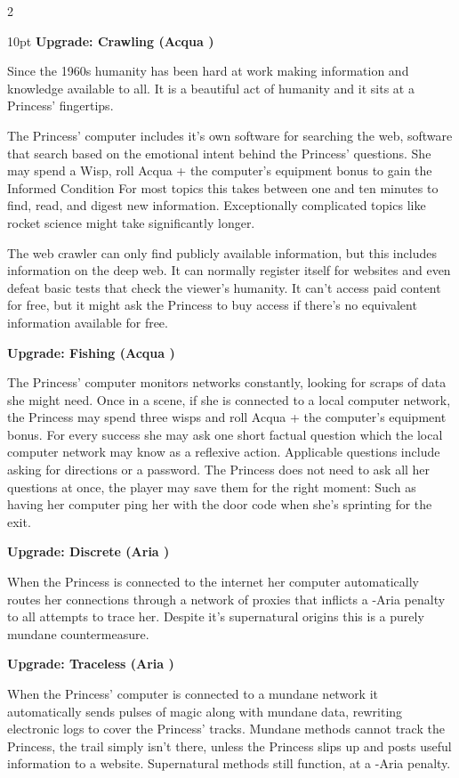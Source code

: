 \begin{multicols}{2}
\begin{myindentpar}{10pt}
\textbf{Upgrade: Crawling (Acqua \textbullet\textbullet)}

Since the 1960s humanity has been hard at work making information and knowledge available to all. It is a beautiful act of humanity and it sits at a Princess' fingertips. 

The Princess' computer includes it's own software for searching the web, software that search based on the emotional intent behind the Princess' questions. She may spend a Wisp, roll Acqua + the computer's equipment bonus to gain the Informed Condition For most topics this takes between one and ten minutes to find, read, and digest new information. Exceptionally complicated topics like rocket science might take significantly longer.

The web crawler can only find publicly available information, but this includes information on the deep web. It can normally register itself for websites and even defeat basic tests that check the viewer's humanity. It can't access paid content for free, but it might ask the Princess to buy access if there's no equivalent information available for free. 

\textbf{Upgrade: Fishing (Acqua \textbullet\textbullet)}

The Princess' computer monitors networks constantly, looking for scraps of data she might need. Once in a scene, if she is connected to a local computer network, the Princess may spend three wisps and roll Acqua + the computer's equipment bonus. For every success she may ask one short factual question which the local computer network may know as a reflexive action. Applicable questions include asking for directions or a password. The Princess does not need to ask all her questions at once, the player may save them for the right moment: Such as having her computer ping her with the door code when she's sprinting for the exit.

\textbf{Upgrade: Discrete (Aria \textbullet\textbullet)}

When the Princess is connected to the internet her computer automatically routes her connections through a network of proxies that inflicts a -Aria penalty to all attempts to trace her. Despite it's supernatural origins this is a purely mundane countermeasure.

\textbf{Upgrade: Traceless (Aria \textbullet\textbullet)}

When the Princess' computer is connected to a mundane network it automatically sends pulses of magic along with mundane data, rewriting electronic logs to cover the Princess' tracks. Mundane methods cannot track the Princess, the trail simply isn't there, unless the Princess slips up and posts useful information to a website. Supernatural methods still function, at a -Aria penalty. 


\end{myindentpar}
\end{multicols}
